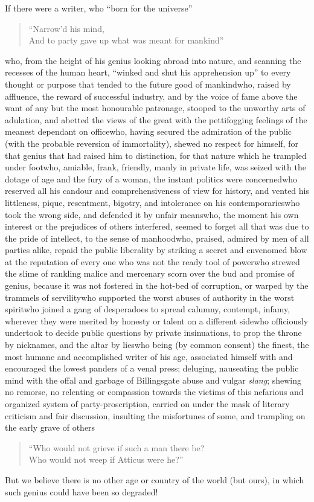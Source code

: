 If there were a writer, who ``born for the universe''
\begin{quotation}
  ``Narrow'd his mind, \\
  And to party gave up what was meant for mankind\textemdash''
\end{quotation}
who, from the height of his genius looking abroad into nature, and
scanning the recesses of the human heart, ``winked and shut his
apprehension up'' to every thought or purpose that tended to the
future good of mankind\textemdash who, raised by affluence, the reward of
successful industry, and by the voice of fame above the want of
any but the most honourable patronage, stooped to the unworthy
arts of adulation, and abetted the views of the great with the
pettifogging feelings of the meanest dependant on office\textemdash who,
having secured the admiration of the public (with the probable
reversion of immortality), shewed no respect for himself, for that
genius that had raised him to distinction, for that nature which
he trampled under foot\textemdash who, amiable, frank, friendly, manly in
private life, was seized with the dotage of age and the fury of a
woman, the instant politics were concerned\textemdash who reserved all his
candour and comprehensiveness of view for history, and vented his
littleness, pique, resentment, bigotry, and intolerance on his
contemporaries\textemdash who took the wrong side, and defended it by unfair
means\textemdash who, the moment his own interest or the prejudices of
others interfered, seemed to forget all that was due to the pride
of intellect, to the sense of manhood\textemdash who, praised, admired by
men of all parties alike, repaid the public liberality by striking
a secret and envenomed blow at the reputation of every one who was
not the ready tool of power\textemdash who strewed the slime of rankling
malice and mercenary scorn over the bud and promise of genius,
because it was not fostered in the hot-bed of corruption, or
warped by the trammels of servility\textemdash who supported the worst
abuses of authority in the worst spirit\textemdash who joined a gang of
desperadoes to spread calumny, contempt, infamy, wherever they
were merited by honesty or talent on a different side\textemdash who
officiously undertook to decide public questions by private
insinuations, to prop the throne by nicknames, and the altar by
lies\textemdash who being (by common consent) the finest, the most humane
and accomplished writer of his age, associated himself with and
encouraged the lowest panders of a venal press; deluging,
nauseating the public mind with the offal and garbage of
Billingsgate abuse and vulgar \emph{slang}; shewing no remorse, no
relenting or compassion towards the victims of this nefarious and
organized system of party-proscription, carried on under the mask
of literary criticism and fair discussion, insulting the
misfortunes of some, and trampling on the early grave of others\textemdash 
\begin{quote}
  ``Who would not grieve if such a man there be? \\
  Who would not weep if Atticus were he?''
\end{quote}
But we believe there is no other age or country of the world (but
ours), in which such genius could have been so degraded!
